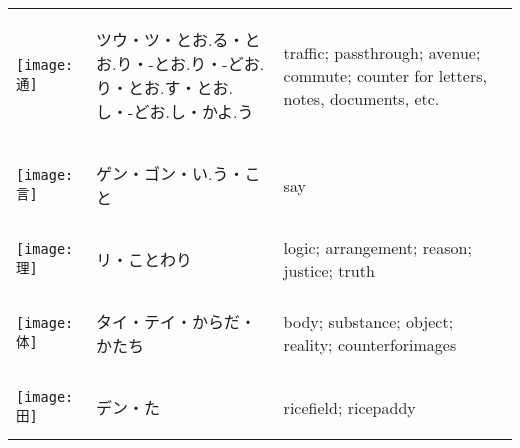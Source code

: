 \documentclass[a4paper,12pt]{extarticle}
\begin{document}
\begin{longtable}{|lp{6cm}p{4cm}|}
\begin{minipage}{0.3\textwidth}
\centerline{
	\texttt{[image: 通]}
}
\end{minipage}
&
\begin{CJK}{UTF8}{min}ツウ・ツ・とお.る・とお.り・-とお.り・-どお.り・とお.す・とお.し・-どお.し・かよ.う\end{CJK}
&
traffic; passthrough; avenue; commute; counter for letters, notes, documents, etc.
\\ 
\begin{minipage}{0.3\textwidth}
\centerline{
	\texttt{[image: 言]}
}
\end{minipage}
&
\begin{CJK}{UTF8}{min}ゲン・ゴン・い.う・こと\end{CJK}
&
say
\\ 
\begin{minipage}{0.3\textwidth}
\centerline{
	\texttt{[image: 理]}
}
\end{minipage}
&
\begin{CJK}{UTF8}{min}リ・ことわり\end{CJK}
&
logic; arrangement; reason; justice; truth
\\ 
\begin{minipage}{0.3\textwidth}
\centerline{
	\texttt{[image: 体]}
}
\end{minipage}
&
\begin{CJK}{UTF8}{min}タイ・テイ・からだ・かたち\end{CJK}
&
body; substance; object; reality; counterforimages
\\ 
\begin{minipage}{0.3\textwidth}
\centerline{
	\texttt{[image: 田]}
}
\end{minipage}
&
\begin{CJK}{UTF8}{min}デン・た\end{CJK}
&
ricefield; ricepaddy
\\ 

\end{longtable}
\end{document}
